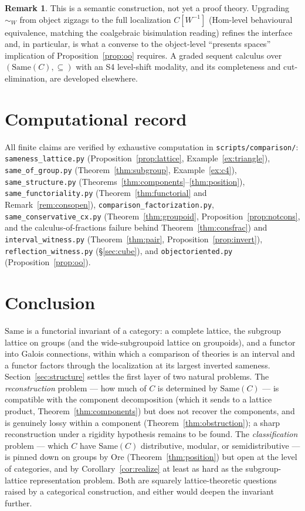\documentclass[11pt]{amsart}
\theoremstyle{definition}
\newtheorem{rem}[thm]{Remark}
\newcommand{\Same}{\mathrm{Same}}
\begin{document}
\begin{rem}\label{rem:oohom}
This is a semantic construction, not yet a proof theory. Upgrading $\sim_W$ from
object zigzags to the full localization $C[W^{-1}]$ (Hom-level behavioural
equivalence, matching the coalgebraic bisimulation reading) refines the interface
and, in particular, is what a converse to the object-level ``presents spaces''
implication of Proposition~\ref{prop:oo} requires. A graded sequent calculus over
$(\Same(C),\subseteq)$ with an S4 level-shift modality, and its completeness and
cut-elimination, are developed elsewhere.
\end{rem}

\section{Computational record}\label{sec:comp}

All finite claims are verified by exhaustive computation in
\texttt{scripts/comparison/}: \texttt{sameness\_lattice.py}
(Proposition~\ref{prop:lattice}, Example~\ref{ex:triangle}),
\texttt{same\_of\_group.py} (Theorem~\ref{thm:subgroup}, Example~\ref{ex:c4}),
\texttt{same\_structure.py}
(Theorems~\ref{thm:components}--\ref{thm:position}),
\texttt{same\_functoriality.py} (Theorem~\ref{thm:functorial} and
Remark~\ref{rem:consopen}), \texttt{comparison\_factorization.py},
\texttt{same\_conservative\_cx.py} (Theorem~\ref{thm:groupoid},
Proposition~\ref{prop:notcons}, and the calculus-of-fractions failure behind
Theorem~\ref{thm:consfrac}) and
\texttt{interval\_witness.py} (Theorem~\ref{thm:pair}, Proposition~\ref{prop:invert}),
\texttt{reflection\_witness.py} (\S\ref{sec:cube}), and
\texttt{objectoriented.py} (Proposition~\ref{prop:oo}).

\section{Conclusion}

$\Same$ is a functorial invariant of a category: a complete lattice, the subgroup
lattice on groups (and the wide-subgroupoid lattice on groupoids), and a functor
into Galois connections, within which a comparison of theories is an interval and
a functor factors through the localization at its largest inverted sameness.
Section~\ref{sec:structure} settles the first layer of two natural problems. The
\emph{reconstruction} problem --- how much of $C$ is determined by $\Same(C)$ ---
is compatible with the component decomposition (which it sends to a lattice
product, Theorem~\ref{thm:components}) but does not recover the components, and is
genuinely lossy within a component (Theorem~\ref{thm:obstruction}); a sharp
reconstruction under a rigidity hypothesis remains to be found. The
\emph{classification} problem --- which $C$ have $\Same(C)$ distributive,
modular, or semidistributive --- is pinned down on groups by Ore
(Theorem~\ref{thm:position}) but open at the level of categories, and by
Corollary~\ref{cor:realize} at least as hard as the subgroup-lattice
representation problem. Both are squarely lattice-theoretic questions raised by a
categorical construction, and either would deepen the invariant further.
\end{document}
